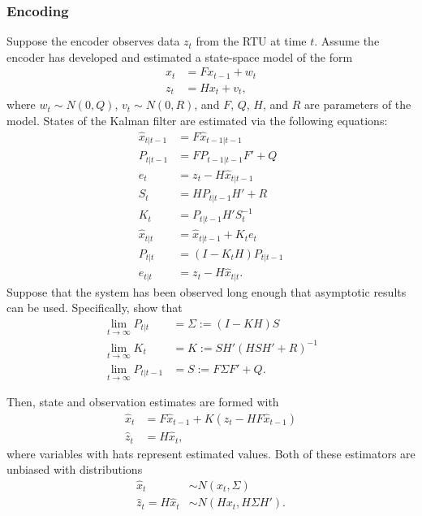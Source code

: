 \documentclass{article}
\begin{document}
\subsubsection{Encoding}

Suppose the encoder observes data $z_t$ from the RTU at time $t$. Assume the encoder has developed and estimated a state-space model of the form
\begin{subequations}
\begin{align}
	\label{eq:encoder-state}
	x_t &= F x_{t-1} + w_t \\
	\label{eq:encoder-obs}
	z_t &= H x_t + v_t,
\end{align}
\end{subequations}
where $w_t\sim N(0, Q)$, $v_t\sim N(0, R)$, and $F$, $Q$, $H$, and $R$ are parameters of the model. States of the Kalman filter are estimated via the following equations:
\begin{subequations}
\begin{align}
	\hat{x}_{t|t-1} &= F \hat{x}_{t-1|t-1} \\
	P_{t|t-1} &= F P_{t-1|t-1} F' + Q \\
	e_t &= z_t - H \hat{x}_{t|t-1} \\
	S_t &= H P_{t|t-1} H' + R \\
	K_t &= P_{t|t-1} H' S_t^{-1} \\
	\hat{x}_{t|t} &= \hat{x}_{t|t-1} + K_t e_t \\
	P_{t|t} &= (I - K_t H) P_{t|t-1} \\
	e_{t|t} &= z_t - H \hat{x}_{t|t}. 
\end{align}
\end{subequations}
Suppose that the system has been observed long enough that asymptotic results can be used. Specifically, \cite{KumarVaraiya} show that
\begin{subequations}
\begin{align}
	\lim_{t\to\infty} P_{t|t} &= \Sigma := (I - KH)S \\
	\lim_{t\to\infty} K_t &= K := S H' (H S H' + R)^{-1} \\
	\lim_{t\to\infty} P_{t|t-1} &= S := F \Sigma F' + Q. 
\end{align}
\end{subequations}

Then, state and observation estimates are formed with
\begin{subequations}
\begin{align}
	\label{eq:encoder-state-est}
	\hat{x}_t &= F \hat{x}_{t-1} + K(z_t - H F \hat{x}_{t-1}) \\
	\hat{z}_t &= H \hat{x}_t,
\end{align}
\end{subequations}
where variables with hats represent estimated values. Both of these estimators are unbiased with distributions
\begin{subequations}
\begin{align}
	\label{eq:encoder-state-est-dist}
	\hat{x}_t &\sim N(x_t, \Sigma) \\
	\label{eq:encoder-obs-est-dist}
	\hat{z}_t = H\hat{x}_t &\sim N(H x_t, H \Sigma H').
\end{align}
\end{subequations}
\end{document}
